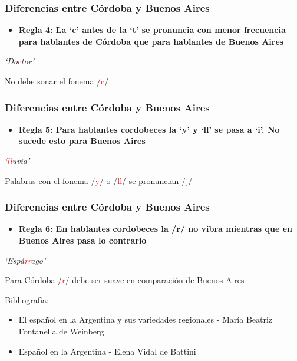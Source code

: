 \documentclass[mathserif]{beamer}%
\begin{document}
\begin{frame}[noframenumbering]
 	\frametitle{Diferencias entre Córdoba y Buenos Aires}
 	\begin{itemize}\itemsep=3ex
 		\item \textbf{Regla 4: La `c' antes de la `t' se pronuncia con menor frecuencia para hablantes de Córdoba que para hablantes de Buenos Aires} \\ 
	\end{itemize}
 	
 	\begin{center}
 		\textit{`Do\textcolor{red}{c}tor'}
 	\end{center} 
 	
 	\begin{center}
 		No debe sonar el fonema /\textcolor{red}{c}/
 	\end{center}
\end{frame}

\begin{frame}[noframenumbering]
	\frametitle{Diferencias entre Córdoba y Buenos Aires}
	\begin{itemize}\itemsep=3ex
		\item \textbf{Regla 5: Para hablantes cordobeces la `y’ y `ll’ se pasa a `i’. No sucede esto para Buenos Aires} \\ 
	\end{itemize}
		
	\begin{center}
		\textit{`\textcolor{red}{ll}uvia'}
	\end{center} 
		
	\begin{center}
		Palabras con el fonema /\textcolor{red}{y}/ o /\textcolor{red}{ll}/ se pronuncian /\textcolor{red}{j}/
	\end{center}
\end{frame}
 
\begin{frame}[noframenumbering]
	\frametitle{Diferencias entre Córdoba y Buenos Aires}
	\begin{itemize}\itemsep=3ex
		\item \textbf{Regla 6: En hablantes cordobeces la /r/ no vibra mientras que en Buenos Aires pasa lo contrario} \\ 
	\end{itemize}	
	
	\begin{center}
		\textit{`Espá\textcolor{red}{rr}ago'}
	\end{center} 
		
	\begin{center}
		Para Córdoba /\textcolor{red}{r}/ debe ser suave en comparación de Buenos Aires
	\end{center}
	
	{\tiny Bibliografía:
		\begin{itemize}
			\item El español en la Argentina y sus variedades regionales - María Beatriz Fontanella de Weinberg
			\item Español en la Argentina - Elena Vidal de Battini
		\end{itemize}}	
\end{frame}
\end{document}
